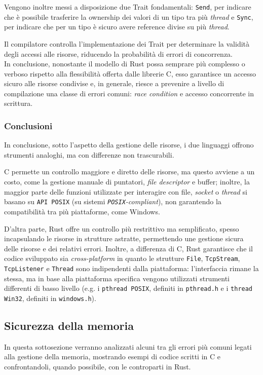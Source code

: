 Vengono inoltre messi a disposizione due Trait fondamentali: \texttt{Send}, per indicare che è possibile trasferire la ownership dei valori di un tipo tra più \textit{thread} e \texttt{Sync}, per indicare che per un tipo è sicuro avere reference divise su più \textit{thread}.

Il compilatore controlla l'implementazione dei Trait per determinare la validità degli accessi alle risorse, riducendo la probabilità di errori di concorrenza. \hfill
\vspace{10pt}\\
\noindent In conclusione, nonostante il modello di Rust possa semprare più complesso o verboso rispetto alla flessibilità offerta dalle librerie C, esso
garantisce un accesso sicuro alle risorse condivise e, in generale, riesce a prevenire a livello di compilazione una classe di errori comuni: \textit{race condition} e accesso concorrente in scrittura.

\subsubsection{Conclusioni}
In conclusione, sotto l'aspetto della gestione delle risorse, i due linguaggi offrono strumenti analoghi, ma con differenze non trascurabili.

C permette un controllo maggiore e diretto delle risorse, ma questo avviene a un costo, come la gestione manuale di puntatori, \textit{file descriptor}
 e buffer; inoltre, la maggior parte delle funzioni utilizzate per interagire con file, \textit{socket} o \textit{thread} si basano su \texttt{API POSIX} (su sistemi \textit{\texttt{POSIX}-compliant}), non garantendo la compatibilità 
tra più piattaforme, come Windows.

D'altra parte, Rust offre un controllo più restrittivo ma semplificato, spesso incapsulando le risorse in strutture astratte, permettendo une gestione sicura delle
 risorse e dei relativi
errori. Inoltre, a differenza di C, Rust garantisce che il codice sviluppato sia \textit{cross-platform} in quanto le strutture \texttt{File}, \texttt{TcpStream}, \texttt{TcpListener} e \texttt{Thread} 
sono indipendenti dalla piattaforma: l'interfaccia rimane la stessa, ma in base alla piattaforma specifica vengono utilizzati strumenti differenti di 
basso livello (e.g. i \texttt{pthread POSIX}, definiti in \texttt{pthread.h} e i \texttt{thread Win32}, definiti in \texttt{windows.h}).

\subsection{Sicurezza della memoria}\label{sub:mem-safe}
In questa sottosezione verranno analizzati alcuni tra gli errori più comuni legati alla gestione della memoria,
mostrando esempi di codice scritti in C e confrontandoli, quando possibile, con le controparti in Rust.

